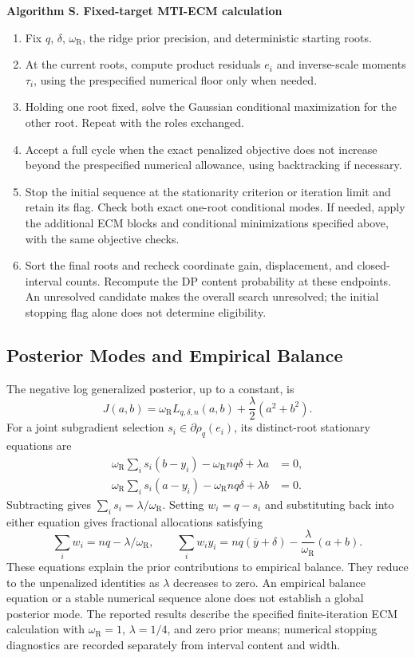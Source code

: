 \documentclass[11pt]{article}
\newcounter{algorithm}
\renewcommand{\thealgorithm}{S\arabic{algorithm}}
\newenvironment{algorithmblock}[1]{%
  \refstepcounter{algorithm}\par\medskip
  \noindent\textbf{Algorithm \thealgorithm. #1}\par
  \begin{enumerate}[leftmargin=2.2em,itemsep=0.25em,parsep=0pt]%
}{%
  \end{enumerate}\par\medskip
}
\begin{document}
\begin{algorithmblock}{Fixed-target MTI-ECM calculation}
\item Fix \(q\), \(\delta\), \(\omega_{\mathrm R}\), the ridge prior precision,
and deterministic starting roots.
\item At the current roots, compute product residuals \(e_i\) and inverse-scale
moments \(\tau_i\), using the prespecified numerical floor only when needed.
\item Holding one root fixed, solve the Gaussian conditional maximization for
the other root. Repeat with the roles exchanged.
\item Accept a full cycle when the exact penalized objective does not increase
beyond the prespecified numerical allowance, using backtracking if necessary.
\item Stop the initial sequence at the stationarity criterion or iteration
limit and retain its flag. Check both exact one-root conditional modes.
If needed, apply the additional ECM blocks and conditional minimizations
specified above, with the same objective checks.
\item Sort the final roots and recheck coordinate gain, displacement, and
closed-interval counts. Recompute the DP content probability at these
endpoints. An unresolved candidate makes the overall search unresolved;
the initial stopping flag alone does not determine eligibility.
\end{algorithmblock}

\subsection{Posterior Modes and Empirical Balance}
\label{sec:supp-mti-mode-balance}

The negative log generalized posterior, up to a constant, is
\[
J(a,b)=\omega_{\mathrm R}L_{q,\delta,n}(a,b)
+\frac{\lambda}{2}(a^2+b^2).
\]
For a joint subgradient selection \(s_i\in\partial\rho_q(e_i)\), its
distinct-root stationary equations are
\begin{align*}
\omega_{\mathrm R}\sum_i s_i(b-y_i)-\omega_{\mathrm R}nq\delta+\lambda a&=0,\\
\omega_{\mathrm R}\sum_i s_i(a-y_i)-\omega_{\mathrm R}nq\delta+\lambda b&=0.
\end{align*}
Subtracting gives \(\sum_i s_i=\lambda/\omega_{\mathrm R}\). Setting
\(w_i=q-s_i\) and substituting back into either equation gives
fractional allocations satisfying
\[
\sum_iw_i=nq-\lambda/\omega_{\mathrm R},\qquad
\sum_iw_i y_i=nq(\overline y+\delta)
-\frac{\lambda}{\omega_{\mathrm R}}(a+b).
\]
These equations explain the prior contributions to empirical balance.
They reduce to the unpenalized identities as \(\lambda\) decreases to zero.
An empirical balance equation or a stable numerical sequence alone does not
establish a global posterior mode. The reported results describe the specified
finite-iteration ECM calculation with \(\omega_{\mathrm R}=1\),
\(\lambda=1/4\), and zero prior means; numerical stopping diagnostics
are recorded separately from interval content and width.
\end{document}

